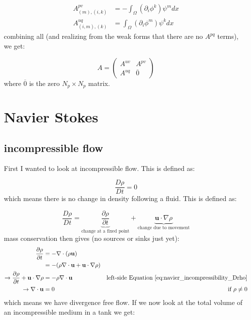 \documentclass{article}
\begin{document}
\begin{align}
    A_{(m),(i,k)}^{pv} &= -\int_\Omega (\partial_{i} \phi^k)\psi^m dx \\
    A_{(i,m),(k)}^{uq} &= \int_\Omega  (\partial_{i} \phi^m)\psi^k dx
\end{align}
combining all (and realizing from the weak forms that there are no $A^{pq}$ terms), we get:

\begin{equation}
    A = \begin{pmatrix}
        A^{uv} & A^{pv} \\
        A^{uq} & \overline{0}
    \end{pmatrix}
\end{equation}
where $\overline{0}$ is the zero $N_p \times N_p$ matrix.
\newpage

\section{Navier Stokes}

\subsection*{incompressible flow}
First I wanted to look at incompressible flow. This is defined as:

\begin{equation}
    \frac{D \rho}{Dt} = 0
\end{equation}
which means there is no change in density following a fluid. This is defined as:

\begin{equation}\label{eq:navier_incompressibility_Drho}
    \frac{D\rho}{Dt}=\underbrace{\frac{\partial\rho}{\partial t}}_{\text{change at a fixed point}}+\underbrace{\mathbf{u}\cdot \nabla \rho}_\text{change due to movement}
\end{equation}
mass conservation then gives (no sources or sinks just yet):
\begin{align*}
    \frac{\partial \rho}{\partial t} &= -\nabla \cdot (\rho \mathbf{u}) \\
    &= -(\rho \nabla\cdot \mathbf{u}+\mathbf{u}\cdot \nabla\rho) \\
    \rightarrow \frac{\partial \rho}{\partial t}+\mathbf{u}\cdot \nabla\rho &=-\rho \nabla\cdot \mathbf{u} &\text{left-side Equation~\ref{eq:navier_incompressibility_Drho}}\\
    \rightarrow \nabla\cdot \mathbf{u} &= 0 \qquad &\text{if }\rho\neq 0
\end{align*}
which means we have divergence free flow. If we now look at the total volume of an incompressible medium in a tank we get:
\end{document}
